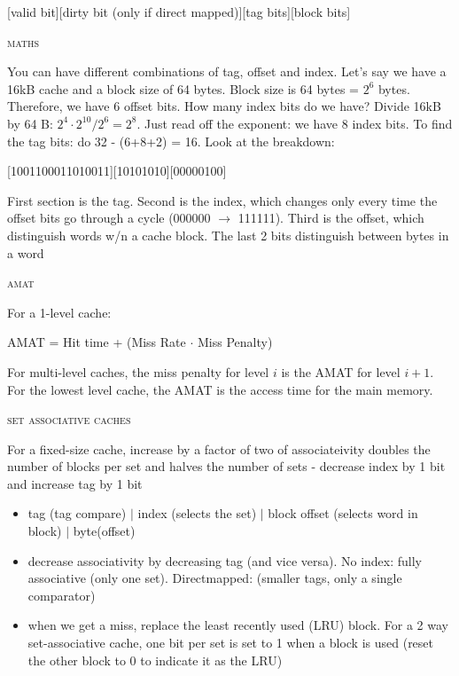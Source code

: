 \documentclass{article}
\begin{document}
	[valid bit][dirty bit (only if direct mapped)][tag bits][block bits]
	

\begin{center}\textsc{maths}\end{center} 
You can have different combinations of tag, offset and index. Let's say we have a 16kB cache and a block size of 64 bytes. Block size is 64 bytes = $2^6$ bytes. Therefore, we have 6 offset bits. How many index bits do we have? Divide
16kB by 64 B: $2^4\cdot2^{10} / 2^6 = 2^8$. Just read off the exponent: we have 8 index bits. To find the tag bits: do 32 - (6+8+2) = 16. 
Look at the breakdown:
\begin{center}[1001100011010011][10101010][00000100]\end{center}
First section is the tag. Second is the index, which changes only every time the offset bits go through a cycle (000000 $\rightarrow$ 111111). Third is the offset, which distinguish words w/n a cache block. The last 2 bits distinguish between bytes in a word

\begin{center}\textsc{amat}\end{center} 
For a 1-level cache:
	
\begin{center}AMAT = Hit time + (Miss Rate $\cdot$ Miss Penalty)\end{center}
	
For multi-level caches, the miss penalty for level $i$ is the AMAT for level $i+1$. For the lowest level cache, the AMAT is the access time for the main memory.
	
	
\begin{center}\textsc{set associative caches}\end{center} 
	For a fixed-size cache, increase by a factor of two of associateivity doubles the number of blocks per set and halves the number of sets - decrease index by 1 bit and increase tag by 1 bit
	\begin{itemize}
		\item tag (tag compare) $|$ index (selects the set) $|$ block offset (selects word in block) $|$ byte(offset)
		\item decrease associativity by decreasing tag (and vice versa). No index: fully associative (only one set). Directmapped: (smaller tags, only a single comparator)
		\item when we get a miss, replace the least recently used (LRU) block. For a 2 way set-associative cache, one bit per set is set to 1 when a block is used (reset the other block to 0 to indicate it as the LRU)
	\end{itemize}
\end{document}
